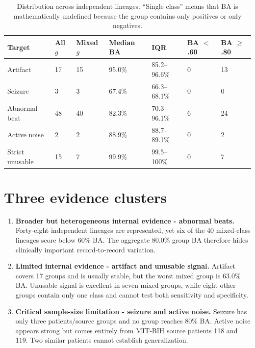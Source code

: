 \documentclass[9pt]{extarticle}
\begin{document}
\begin{table}[h!]
\centering
\caption*{Distribution across independent lineages. ``Single class'' means that BA is mathematically undefined because the group contains only positives or only negatives.}
\scriptsize
\setlength{\tabcolsep}{4pt}
\begin{tabularx}{0.94\linewidth}{@{}Y C{0.42in} C{0.48in} C{0.68in} C{0.64in} C{0.48in} C{0.48in}@{}}
\toprule
Target & All $g$ & Mixed $g$ & Median BA & IQR & BA $<$.60 & BA $\geq$.80 \\
\midrule
Artifact & 17 & 15 & 95.0\% & 85.2--96.6\% & 0 & 13 \\
Seizure & 3 & 3 & 67.4\% & 66.3--68.1\% & 0 & 0 \\
Abnormal beat & 48 & 40 & 82.3\% & 70.3--96.1\% & 6 & 24 \\
Active noise & 2 & 2 & 88.9\% & 88.7--89.1\% & 0 & 2 \\
Strict unusable & 15 & 7 & 99.9\% & 99.5--100\% & 0 & 7 \\
\bottomrule
\end{tabularx}
\end{table}
\vspace{-5pt}

\section*{Three evidence clusters}
\begin{enumerate}
\item \textbf{Broader but heterogeneous internal evidence - abnormal beats.} Forty-eight independent lineages are represented, yet six of the 40 mixed-class lineages score below 60\% BA. The aggregate 80.0\% group BA therefore hides clinically important record-to-record variation.
\item \textbf{Limited internal evidence - artifact and unusable signal.} Artifact covers 17 groups and is usually stable, but the worst mixed group is 63.0\% BA. Unusable signal is excellent in seven mixed groups, while eight other groups contain only one class and cannot test both sensitivity and specificity.
\item \textbf{Critical sample-size limitation - seizure and active noise.} Seizure has only three patients/source groups and no group reaches 80\% BA. Active noise appears strong but comes entirely from MIT-BIH source patients 118 and 119. Two similar patients cannot establish generalization.
\end{enumerate}
\end{document}
